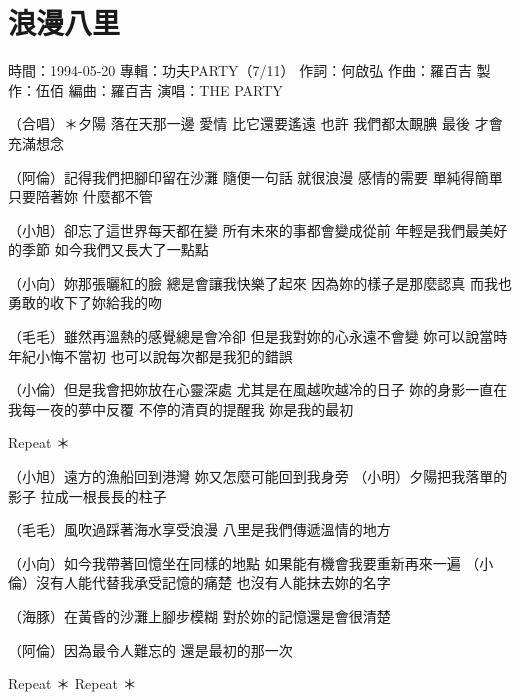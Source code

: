 \documentclass[UTF8,a4paper,oneside,twocolumn,12pt]{ctexbook}
\newcommand{\infopair}[2]{\textbullet #1：#2}
\newcommand{\zc}[1][伍佰]{\infopair{作詞}{#1}}
\newcommand{\zq}[1][伍佰]{\infopair{作曲}{#1}}
\newcommand{\bq}[1][伍佰]{\infopair{編曲}{#1}}
\newcommand{\zj}[1]{\infopair{專輯}{#1}}
\newcommand{\zz}[1]{\infopair{製作}{#1}}
\newcommand{\sj}[1]{\infopair{時間}{#1}}
\newenvironment{info}{\begin{flushleft}\kaishu
	}
	{\end{flushleft}\normalsize\yahei\par}
\newenvironment{lyric}{
	}
{}
\begin{document}
\section{浪漫八里}
\begin{info}
	\sj{1994-05-20}
	\zj{功夫PARTY（7/11）}
	\zc[何啟弘]
	\zq[羅百吉]
	\zz{伍佰}
	\bq[羅百吉]
	\infopair{演唱}{THE PARTY}
\end{info}
\begin{lyric}
	（合唱）＊夕陽 落在天那一邊 愛情 比它還要遙遠
	也許 我們都太靦腆 最後 才會充滿想念

	（阿倫）記得我們把腳印留在沙灘 隨便一句話 就很浪漫
	感情的需要 單純得簡單 只要陪著妳 什麼都不管

	（小旭）卻忘了這世界每天都在變 所有未來的事都會變成從前
	年輕是我們最美好的季節 如今我們又長大了一點點

	（小向）妳那張曬紅的臉 總是會讓我快樂了起來
	因為妳的樣子是那麼認真 而我也勇敢的收下了妳給我的吻

	（毛毛）雖然再溫熱的感覺總是會冷卻 但是我對妳的心永遠不會變
	妳可以說當時年紀小悔不當初 也可以說每次都是我犯的錯誤

	（小倫）但是我會把妳放在心靈深處 尤其是在風越吹越冷的日子
	妳的身影一直在我每一夜的夢中反覆
	不停的清頁的提醒我 妳是我的最初

	Repeat ＊

	（小旭）遠方的漁船回到港灣 妳又怎麼可能回到我身旁
	（小明）夕陽把我落單的影子 拉成一根長長的柱子

	（毛毛）風吹過踩著海水享受浪漫 八里是我們傳遞溫情的地方

	（小向）如今我帶著回憶坐在同樣的地點
	如果能有機會我要重新再來一遍
	（小倫）沒有人能代替我承受記憶的痛楚
	也沒有人能抹去妳的名字

	（海豚）在黃昏的沙灘上腳步模糊 對於妳的記憶還是會很清楚

	（阿倫）因為最令人難忘的 還是最初的那一次

	Repeat ＊
	Repeat ＊
\end{lyric}
\end{document}
